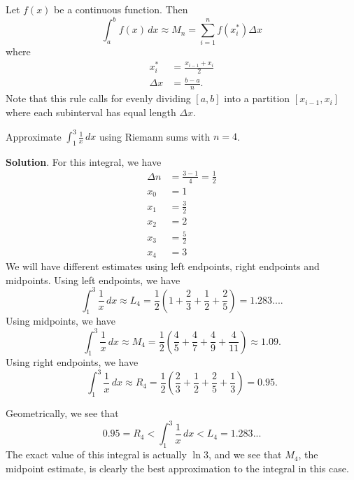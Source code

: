 \documentclass[10pt,]{book}
\theoremstyle{ptxplainnotitle}
\theoremstyle{ptxplaintitle}
\theoremstyle{ptxplainnotitle}
\theoremstyle{ptxplaintitle}
\theoremstyle{ptxplainnotitle}
\theoremstyle{ptxplaintitle}
\theoremstyle{ptxdefinitionnotitle}
\theoremstyle{ptxdefinitiontitle}
\theoremstyle{ptxdefinitionnotitle}
\theoremstyle{ptxdefinitiontitle}
\theoremstyle{ptxdefinitionnotitle}
\theoremstyle{ptxdefinitiontitle}
\theoremstyle{ptxdefinitionnotitle}
\theoremstyle{ptxdefinitiontitle}
\theoremstyle{ptxdefinitionnotitle}
\theoremstyle{ptxdefinitiontitle}
\numberwithin{equation}{section}
\begin{document}
\begin{definition}\label{definition-midpoint-rule}
\hypertarget{p-438}{}%
Let \(f(x)\) be a continuous function. Then%
\begin{equation*}
\int_{a}^{b}f(x)\,dx \approx M_{n} = \sum_{i=1}^{n}f(x_{i}^{*})\Delta x
\end{equation*}
where%
\begin{align*}
x_{i}^{*} & = \frac{x_{i-1}+x_{i}}{2} \\
\Delta x & = \frac{b-a}{n}. 
\end{align*}
Note that this rule calls for evenly dividing \([a,b]\) into a partition \([x_{i-1},x_{i}]\) where each subinterval has equal length \(\Delta x\).%
\end{definition}
\begin{example}\label{example-approximating-an-integral}
\hypertarget{p-439}{}%
Approximate \(\int_{1}^{3}\frac{1}{x}\,dx\) using Riemann sums with \(n=4\).%
\par\smallskip%
\noindent\textbf{Solution}.\hypertarget{solution-96}{}\quad%
\hypertarget{p-440}{}%
For this integral, we have%
\begin{align*}
\Delta n & = \frac{3-1}{4} = \frac{1}{2} \\
x_{0} & = 1 \\
x_{1} & = \frac{3}{2} \\
x_{2} & = 2 \\
x_{3} & = \frac{5}{2} \\
x_{4} & = 3 
\end{align*}
We will have different estimates using left endpoints, right endpoints and midpoints. Using left endpoints, we have%
\begin{equation*}
\int_{1}^{3}\frac{1}{x}\,dx \approx L_{4} = \frac{1}{2}\left(1 + \frac{2}{3} + \frac{1}{2} + \frac{2}{5}\right) = 1.283....
\end{equation*}
Using midpoints, we have%
\begin{equation*}
\int_{1}^{3}\frac{1}{x}\,dx \approx M_{4} = \frac{1}{2}\left(\frac{4}{5} + \frac{4}{7} + \frac{4}{9} + \frac{4}{11}\right) \approx1.09.
\end{equation*}
Using right endpoints, we have%
\begin{equation*}
\int_{1}^{3}\frac{1}{x}\,dx \approx R_{4} = \frac{1}{2}\left(\frac{2}{3} + \frac{1}{2} + \frac{2}{5} + \frac{1}{3}\right) = 0.95.
\end{equation*}
%
\par
\hypertarget{p-441}{}%
Geometrically, we see that%
\begin{equation*}
0.95 = R_{4} < \int_{1}^{3}\frac{1}{x}\,dx < L_{4} = 1.283...
\end{equation*}
The exact value of this integral is actually \(\ln 3\), and we see that \(M_{4}\), the midpoint estimate, is clearly the best approximation to the integral in this case.%
\end{example}
\end{document}
